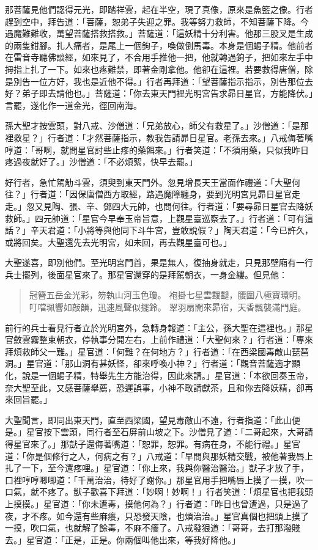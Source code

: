 那菩薩見他們認得元光，即踏祥雲，起在半空，現了真像，原來是魚籃之像。行者趕到空中，拜告道：「菩薩，恕弟子失迎之罪。我等努力救師，不知菩薩下降。今遇魔難難收，萬望菩薩搭救搭救。」菩薩道：「這妖精十分利害。他那三股叉是生成的兩隻鉗腳。扎人痛者，是尾上一個鉤子，喚做倒馬毒。本身是個蝎子精。他前者在雷音寺聽佛談經，如來見了，不合用手推他一把，他就轉過鉤子，把如來左手中拇指上扎了一下。如來也疼難禁，即著金剛拿他。他卻在這裡。若要救得唐僧，除是別告一位方好，我也是近他不得。」行者再拜道：「望菩薩指示指示，別告那位去好？弟子即去請他也。」菩薩道：「你去東天門裡光明宮告求昴日星官，方能降伏。」言罷，遂化作一道金光，徑回南海。

孫大聖才按雲頭，對八戒、沙僧道：「兄弟放心，師父有救星了。」沙僧道：「是那裡救星？」行者道：「才然菩薩指示，教我告請昴日星官。老孫去來。」八戒侮著嘴哼道：「哥啊，就問星官討些止疼的藥餌來。」行者笑道：「不須用藥，只似我昨日疼過夜就好了。」沙僧道：「不必煩絮，快早去罷。」

好行者，急忙駕觔斗雲，須臾到東天門外。忽見增長天王當面作禮道：「大聖何往？」行者道：「因保唐僧西方取經，路遇魔障纏身，要到光明宮見昴日星官走走。」忽又見陶、張、辛、鄧四大元帥，也問何往。行者道：「要尋昴日星官去降妖救師。」四元帥道：「星官今早奉玉帝旨意，上觀星臺巡察去了。」行者道：「可有這話？」辛天君道：「小將等與他同下斗牛宮，豈敢說假？」陶天君道：「今已許久，或將回矣。大聖還先去光明宮，如未回，再去觀星臺可也。」

大聖遂喜，即別他們。至光明宮門首，果是無人，復抽身就走，只見那壁廂有一行兵士擺列，後面星官來了。那星官還穿的是拜駕朝衣，一身金縷。但見他：
\begin{quote}
冠簪五岳金光彩，笏執山河玉色瓊。
袍掛七星雲靉靆，腰圍八極寶環明。
叮噹珮響如敲韻，迅速風聲似擺鈴。
翠羽扇開來昴宿，天香飄襲滿門庭。
\end{quote}

前行的兵士看見行者立於光明宮外，急轉身報道：「主公，孫大聖在這裡也。」那星官斂雲霧整束朝衣，停執事分開左右，上前作禮道：「大聖何來？」行者道：「專來拜煩救師父一難。」星官道：「何難？在何地方？」行者道：「在西梁國毒敵山琵琶洞。」星官道：「那山洞有甚妖怪，卻來呼喚小神？」行者道：「觀音菩薩適才顯化，說是一個蝎子精，特舉先生方能治得，因此來請。」星官道：「本欲回奏玉帝，奈大聖至此，又感菩薩舉薦，恐遲誤事，小神不敢請獻茶，且和你去降妖精，卻再來回旨罷。」

大聖聞言，即同出東天門，直至西梁國，望見毒敵山不遠，行者指道：「此山便是。」星官按下雲頭，同行者至石屏前山坡之下。沙僧見了道：「二哥起來，大哥請得星官來了。」那獃子還侮著嘴道：「恕罪，恕罪。有病在身，不能行禮。」星官道：「你是個修行之人，何病之有？」八戒道：「早間與那妖精交戰，被他著我唇上扎了一下，至今還疼哩。」星官道：「你上來，我與你醫治醫治。」獃子才放了手，口裡哼哼唧唧道：「千萬治治，待好了謝你。」那星官用手把嘴唇上摸了一摸，吹一口氣，就不疼了。獃子歡喜下拜道：「妙啊！妙啊！」行者笑道：「煩星官也把我頭上摸摸。」星官道：「你未遭毒，摸他何為？」行者道：「昨日也曾遭過，只是過了夜，才不疼。如今還有些麻癢，只恐發天陰，也煩治治。」星官真個也把頭上摸了一摸，吹口氣，也就解了餘毒，不麻不癢了。八戒發狠道：「哥哥，去打那潑賤去。」星官道：「正是，正是。你兩個叫他出來，等我好降他。」

